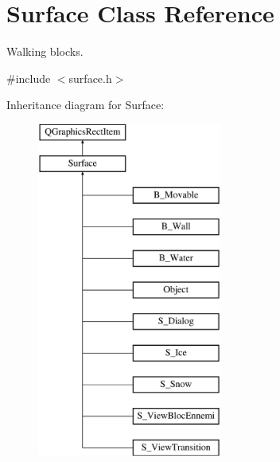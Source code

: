 \hypertarget{class_surface}{}\section{Surface Class Reference}
\label{class_surface}


Walking blocks.  




{\ttfamily \#include $<$surface.\+h$>$}

Inheritance diagram for Surface\+:\begin{figure}[H]
\begin{center}
\leavevmode
\includegraphics[height=11.000000cm]{class_surface}
\end{center}
\end{figure}
